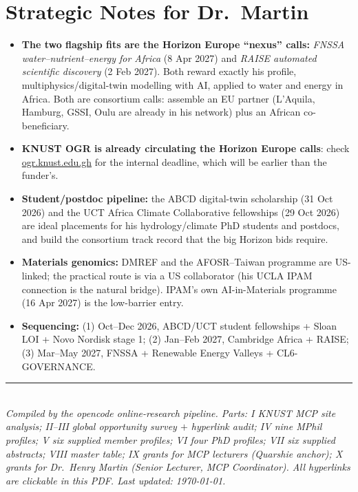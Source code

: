\documentclass[11pt,a4paper]{article}
\begin{document}
\section{Strategic Notes for Dr.\ Martin}

\begin{itemize}[leftmargin=1.4em]
  \item \textbf{The two flagship fits are the Horizon Europe ``nexus'' calls:} \emph{FNSSA water--nutrient--energy for Africa} (8 Apr 2027) and \emph{RAISE automated scientific discovery} (2 Feb 2027). Both reward exactly his profile, multiphysics/digital-twin modelling with AI, applied to water and energy in Africa. Both are consortium calls: assemble an EU partner (L'Aquila, Hamburg, GSSI, Oulu are already in his network) plus an African co-beneficiary.
  \item \textbf{KNUST OGR is already circulating the Horizon Europe calls}: check \href{https://ogr.knust.edu.gh/}{ogr.knust.edu.gh} for the internal deadline, which will be earlier than the funder's.
  \item \textbf{Student/postdoc pipeline:} the ABCD digital-twin scholarship (31 Oct 2026) and the UCT Africa Climate Collaborative fellowships (29 Oct 2026) are ideal placements for his hydrology/climate PhD students and postdocs, and build the consortium track record that the big Horizon bids require.
  \item \textbf{Materials genomics:} DMREF and the AFOSR--Taiwan programme are US-linked; the practical route is via a US collaborator (his UCLA IPAM connection is the natural bridge). IPAM's own AI-in-Materials programme (16 Apr 2027) is the low-barrier entry.
  \item \textbf{Sequencing:} (1) Oct--Dec 2026, ABCD/UCT student fellowships + Sloan LOI + Novo Nordisk stage 1; (2) Jan--Feb 2027, Cambridge Africa + RAISE; (3) Mar--May 2027, FNSSA + Renewable Energy Valleys + CL6-GOVERNANCE.
\end{itemize}

\bigskip
\noindent\rule{\textwidth}{0.4pt}\\
\small\emph{Compiled by the opencode online-research pipeline. Parts: I KNUST MCP site analysis; II--III global opportunity survey $+$ hyperlink audit; IV nine MPhil profiles; V six supplied member profiles; VI four PhD profiles; VII six supplied abstracts; VIII master table; IX grants for MCP lecturers (Quarshie anchor); X grants for Dr.\ Henry Martin (Senior Lecturer, MCP Coordinator). All hyperlinks are clickable in this PDF. Last updated: \today.}
\end{document}
